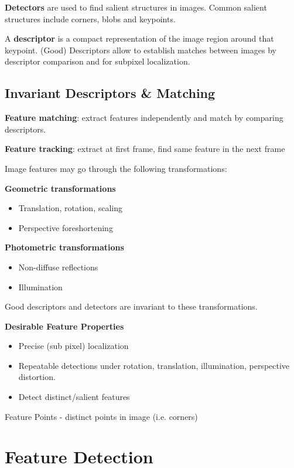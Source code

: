 \textbf{Detectors} are used to find salient structures in images. Common salient structures include corners, blobs
and keypoints.

A \textbf{descriptor} is a compact representation of the image region around that keypoint. (Good) Descriptors allow to establish matches between images by descriptor comparison and for subpixel localization.

\subsection{Invariant Descriptors \& Matching}

\textbf{Feature matching}: extract features independently and match by comparing descriptors.

\textbf{Feature tracking}: extract at first frame, find same feature in the next frame

Image features may go through the following transformations:

\textbf{Geometric transformations}
\begin{itemize}
\item Translation, rotation, scaling
\item Perspective foreshortening 
\end{itemize}

\textbf{Photometric transformations}
\begin{itemize}
\item Non-diffuse reflections 
\item Illumination
\end{itemize}

Good descriptors and detectors are invariant to these transformations. 

\textbf{Desirable Feature Properties}
\begin{itemize} 
\item Precise (sub pixel) localization
\item Repeatable detections under rotation, translation, illumination, perspective distortion.
\item Detect distinct/salient features
\end{itemize}

Feature Points - distinct points in image (i.e. corners)

\section{Feature Detection}

